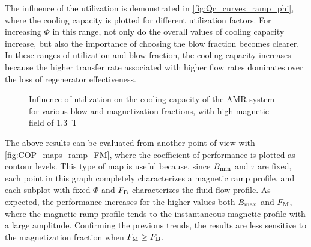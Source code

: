 \documentclass[referee]{svjour3}
\newcommand{\bmax}{\ensuremath{{B}\ped{max}}}
\newcommand{\bmin}{\ensuremath{{B}\ped{min}}}
\begin{document}
The influence of \textcolor{black}{the} utilization is demonstrated in \autoref{fig:Qc_curves_ramp_phi}, where the cooling capacity \textcolor{black}{is} plotted for different utilization factors. For increasing $\Phi$ in this range, not only do the overall values of cooling capacity increase, but also the importance of choosing the blow fraction becomes clearer. In \textcolor{black}{these ranges} of utilization and blow fraction,  the cooling capacity increases because the higher transfer rate associated with higher flow rates \textcolor{black}{dominates} over the loss of regenerator effectiveness.

\begin{figure}[!ht]
  \centering
\quad
  \caption{Influence of utilization on the cooling capacity of the AMR system for  various blow and magnetization fractions, with high magnetic field of \SI{1.3}{\tesla}}
  \label{fig:Qc_curves_ramp_phi}
\end{figure}

The \textcolor{black}{above} results can be \textcolor{black}{evaluated from} another point of view with \autoref{fig:COP_maps_ramp_FM}, where the coefficient of performance is plotted as contour levels. This type of map is useful because, since $\bmin$ and $\tau$ are fixed, each point in this graph completely characterizes a magnetic \textcolor{black}{ramp} profile, and each subplot with fixed $\Phi$ and $F_{\mathrm{B}}$ characterizes the fluid flow profile. As expected, the performance increases for the higher values both $\bmax$ and $F_{\mathrm{M}}$, where the  magnetic \textcolor{black}{ramp} profile tends to the instantaneous magnetic profile with a large amplitude. Confirming the previous trends, the results are less sensitive to the magnetization fraction when $F_{\mathrm{M}} \ge F_{\mathrm{B}}$. 
\end{document}
